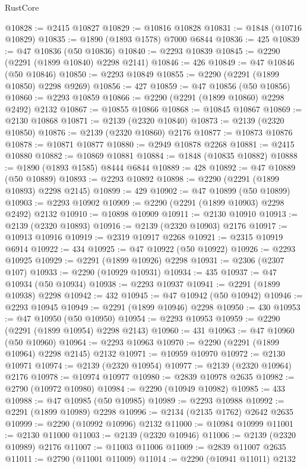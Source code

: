 \begin{lexlean}{RustCore}
\begin{coremodule}
@10828 := @2415 @10827
@10829 := @10816 @10828
@10831 := @1848 (@10716 @10829)
@10835 := @1890 (@1893 @1578) @7000 @6844
@10836 := 425
@10839 := @47 @10836 (@50 @10836)
@10840 := @2293 @10839
@10845 := @2290 (@2291 (@1899 @10840) @2298 @2141)
@10846 := 426
@10849 := @47 @10846 (@50 @10846)
@10850 := @2293 @10849
@10855 := @2290 (@2291 (@1899 @10850) @2298 @9269)
@10856 := 427
@10859 := @47 @10856 (@50 @10856)
@10860 := @2293 @10859
@10866 := @2290 (@2291 (@1899 @10860) @2298 @2492) @2132
@10867 := @10855 @10866
@10868 := @10845 @10867
@10869 := @2130 @10868
@10871 := @2139 (@2320 @10840)
@10873 := @2139 (@2320 @10850)
@10876 := @2139 (@2320 @10860) @2176
@10877 := @10873 @10876
@10878 := @10871 @10877
@10880 := @2949 @10878 @2268
@10881 := @2415 @10880
@10882 := @10869 @10881
@10884 := @1848 (@10835 @10882)
@10888 := @1890 (@1893 @1585) @8444 @6844
@10889 := 428
@10892 := @47 @10889 (@50 @10889)
@10893 := @2293 @10892
@10898 := @2290 (@2291 (@1899 @10893) @2298 @2145)
@10899 := 429
@10902 := @47 @10899 (@50 @10899)
@10903 := @2293 @10902
@10909 := @2290 (@2291 (@1899 @10903) @2298 @2492) @2132
@10910 := @10898 @10909
@10911 := @2130 @10910
@10913 := @2139 (@2320 @10893)
@10916 := @2139 (@2320 @10903) @2176
@10917 := @10913 @10916
@10919 := @2319 @10917 @2268
@10921 := @2315 @10919 @6914
@10922 := 434
@10925 := @47 @10922 (@50 @10922)
@10926 := @2293 @10925
@10929 := @2291 (@1899 @10926) @2298
@10931 := @2306 (@2307 @107)
@10933 := @2290 (@10929 @10931)
@10934 := 435
@10937 := @47 @10934 (@50 @10934)
@10938 := @2293 @10937
@10941 := @2291 (@1899 @10938) @2298
@10942 := 432
@10945 := @47 @10942 (@50 @10942)
@10946 := @2293 @10945
@10949 := @2291 (@1899 @10946) @2298
@10950 := 430
@10953 := @47 @10950 (@50 @10950)
@10954 := @2293 @10953
@10959 := @2290 (@2291 (@1899 @10954) @2298 @2143)
@10960 := 431
@10963 := @47 @10960 (@50 @10960)
@10964 := @2293 @10963
@10970 := @2290 (@2291 (@1899 @10964) @2298 @2145) @2132
@10971 := @10959 @10970
@10972 := @2130 @10971
@10974 := @2139 (@2320 @10954)
@10977 := @2139 (@2320 @10964) @2176
@10978 := @10974 @10977
@10980 := @2839 @10978 @2635
@10982 := @2790 (@10972 @10980)
@10984 := @2290 (@10949 @10982)
@10985 := 433
@10988 := @47 @10985 (@50 @10985)
@10989 := @2293 @10988
@10992 := @2291 (@1899 @10989) @2298
@10996 := @2134 (@2135 @1762) @2642 @2635
@10999 := @2290 (@10992 @10996) @2132
@11000 := @10984 @10999
@11001 := @2130 @11000
@11003 := @2139 (@2320 @10946)
@11006 := @2139 (@2320 @10989) @2176
@11007 := @11003 @11006
@11009 := @2839 @11007 @2635
@11011 := @2790 (@11001 @11009)
@11014 := @2290 (@10941 @11011) @2132

\end{coremodule}
\end{lexlean}

